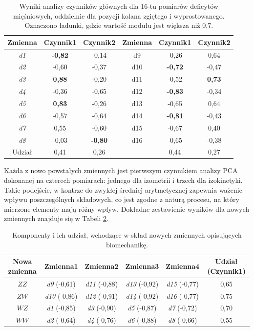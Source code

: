 \begin{table}[t!]
	\centering
	\setlength{\tabcolsep}{3pt}
	\setlength\extrarowheight{2pt}
	\caption{Wyniki analizy czynników głównych dla 16-tu pomiarów deficytów mięśniowych, oddzielnie dla pozycji kolana zgiętego i wyprostowanego. Oznaczono ładunki, gdzie wartość modułu jest większa niż 0,7.}
	\label{tab:pca-muscles-knee-strait-bended}
	\begin{tabular}{c|c|c||c|c|c}
		
		Zmienna&Czynnik1&Czynnik2&Zmienna&Czynnik1&Czynnik2 \\
		\hline \hline
		\textit{d1}&\textbf{-0,82}&-0,14&d9&-0,26&0,64 \\
		\hline
		\textit{d2}&-0,60&-0,37&d10&\textbf{-0,72}&-0,47 \\
		\hline
		\textit{d3}&\textbf{0,88}&-0,20&d11&-0,52&\textbf{0,73} \\
		\hline
		\textit{d4}&-0,36&-0,65&d12&\textbf{-0,83}&-0,34 \\
		\hline
		\textit{d5}&\textbf{0,83}&-0,26&d13&-0,65&0,64 \\
		\hline
		\textit{d6}&-0,57&-0,64&d14&\textbf{-0,81}&-0,43 \\
		\hline
		\textit{d7}&0,55&-0,60&d15&-0,67&0,40 \\
		\hline
		\textit{d8}&-0,03&\textbf{-0,80}&d16&-0,65&-0,38 \\
		\hline\hline
		Udział&0,41&0,26&&0,44&0,27 \\
		
	\end{tabular}
\end{table}

Każda z nowo powstałych zmiennych jest pierwszym czynnikiem analizy PCA dokonanej na czterech pomiarach: jednego dla izometrii i trzech dla izokinetyki. Takie podejście, w kontrze do zwykłej średniej arytmetycznej zapewnia ważenie wpływu poszczególnych składowych, co jest zgodne z naturą procesu, na który mierzone elementy mają różny wpływ. Dokładne zestawienie wyników dla nowych zmiennych znajduje się w Tabeli \ref{tab:bio-new-factors}.
\begin{table}[h!]
	\centering
	\setlength{\tabcolsep}{3pt}
	\setlength\extrarowheight{2pt}
	\caption{Komponenty i ich udział, wchodzące w skład nowych zmiennych opisujących biomechanikę.}
	\label{tab:bio-new-factors}
	\begin{tabular}{c|c|c|c|c||c}
		Nowa zmienna&Zmienna1&Zmienna2&Zmienna3&Zmienna4&Udział (Czynnik1) \\
		\hline \hline
		$ZZ$&\textit{d9} (-0,61)&\textit{d11} (-0,88)&\textit{d13} (-0,92)&\textit{d15} (-0,77)&0,65\\
		\hline
		$ZW$&\textit{d10} (-0,86)&\textit{d12} (-0,91)&\textit{d14} (-0,92)&\textit{d16} (-0,77)&0,75\\
		\hline
		$WZ$&\textit{d1} (-0,85)&\textit{d3} (-0,90)&\textit{d5} (-0,87)&\textit{d7} (-0,72)&0,70\\
		\hline
		$WW$&\textit{d2} (-0,64)&\textit{d4} (-0,76)&\textit{d6} (-0,88)&\textit{d8} (-0,66)&0,55\\
		
		
	\end{tabular}
\end{table}

